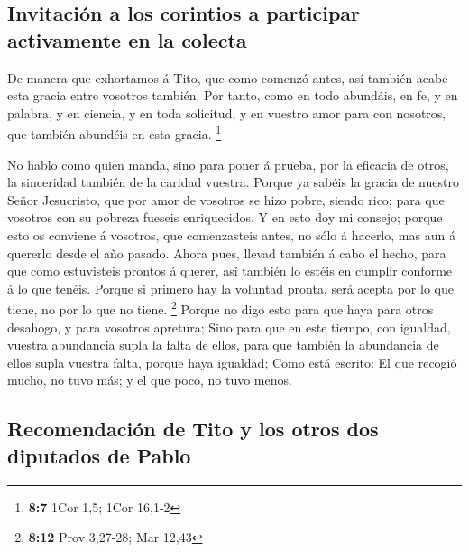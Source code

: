 \hypertarget{invitaciuxf3n-a-los-corintios-a-participar-activamente-en-la-colecta}{%
\subsection{Invitación a los corintios a participar activamente en la
colecta}\label{invitaciuxf3n-a-los-corintios-a-participar-activamente-en-la-colecta}}

 De manera que exhortamos á Tito, que como comenzó antes,
así también acabe esta gracia entre vosotros también.  Por
tanto, como en todo abundáis, en fe, y en palabra, y en ciencia, y en
toda solicitud, y en vuestro amor para con nosotros, que también
abundéis en esta gracia. \footnote{\textbf{8:7} 1Cor 1,5; 1Cor 16,1-2}

 No hablo como quien manda, sino para poner á prueba, por
la eficacia de otros, la sinceridad también de la caridad vuestra.
 Porque ya sabéis la gracia de nuestro Señor Jesucristo,
que por amor de vosotros se hizo pobre, siendo rico; para que vosotros
con su pobreza fueseis enriquecidos.  Y en esto doy mi
consejo; porque esto os conviene á vosotros, que comenzasteis antes, no
sólo á hacerlo, mas aun á quererlo desde el año pasado. 
Ahora pues, llevad también á cabo el hecho, para que como estuvisteis
prontos á querer, así también lo estéis en cumplir conforme á lo que
tenéis.  Porque si primero hay la voluntad pronta, será
acepta por lo que tiene, no por lo que no tiene. \footnote{\textbf{8:12}
  Prov 3,27-28; Mar 12,43}  Porque no digo esto para que
haya para otros desahogo, y para vosotros apretura;  Sino
para que en este tiempo, con igualdad, vuestra abundancia supla la falta
de ellos, para que también la abundancia de ellos supla vuestra falta,
porque haya igualdad;  Como está escrito: El que recogió
mucho, no tuvo más; y el que poco, no tuvo menos.

\hypertarget{recomendaciuxf3n-de-tito-y-los-otros-dos-diputados-de-pablo}{%
\subsection{Recomendación de Tito y los otros dos diputados de
Pablo}\label{recomendaciuxf3n-de-tito-y-los-otros-dos-diputados-de-pablo}}

